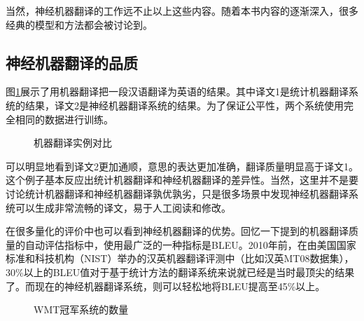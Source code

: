 \parinterval  当然，神经机器翻译的工作远不止以上这些内容。随着本书内容的逐渐深入，很多经典的模型和方法都会被讨论到。


\subsection{神经机器翻译的品质}

\parinterval  图\ref{fig:10-2}展示了用机器翻译把一段汉语翻译为英语的结果。其中译文1是统计机器翻译系统的结果，译文2是神经机器翻译系统的结果。为了保证公平性，两个系统使用完全相同的数据进行训练。

%

\begin{figure}[htp]
\centering

\vspace{-0.6em}
\caption{机器翻译实例对比}
\label{fig:10-2}
\end{figure}

\parinterval  可以明显地看到译文2更加通顺，意思的表达更加准确，翻译质量明显高于译文1。这个例子基本反应出统计机器翻译和神经机器翻译的差异性。当然，这里并不是要讨论统计机器翻译和神经机器翻译孰优孰劣，只是很多场景中发现神经机器翻译系统可以生成非常流畅的译文，易于人工阅读和修改。

\parinterval  在很多量化的评价中也可以看到神经机器翻译的优势。回忆一下{\chapterfour}提到的机器翻译质量的自动评估指标中，使用最广泛的一种指标是BLEU。2010年前，在由美国国家标准和科技机构（NIST）举办的汉英机器翻译评测中（比如汉英MT08数据集），30\%以上的BLEU值对于基于统计方法的翻译系统来说就已经是当时最顶尖的结果了。而现在的神经机器翻译系统，则可以轻松地将BLEU提高至45\%以上。

\begin{figure}[htp]
\centering

\caption{WMT冠军系统的数量}
\label{fig:10-3}
\end{figure}

